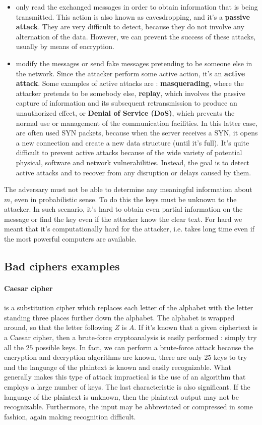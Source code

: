 \documentclass[11pt]{article}
\begin{document}
\begin{itemize}
\item only read the exchanged messages in order to obtain information that is being transmitted. This action is also known as eavesdropping, and it's a \textbf{passive attack}. They are very difficult to detect, because they do not involve any alternation of the data. However, we can prevent the success of these attacks, usually by means of encryption.
\item modify the messages or send fake messages pretending to be someone else in the network. Since the attacker perform some active action, it's an \textbf{active attack}. Some examples of active attacks are : \textbf{masquerading}, where the attacker pretends to be somebody else, \textbf{replay}, which involves the passive capture of information and its subsequent retransmission to produce an unauthorized effect, or \textbf{Denial of Service (DoS)}, which prevents the normal use or management of the communication facilities. In this latter case, are often used SYN packets, because when the server receives a SYN, it opens a new connection and create a new data structure (until it's full). It's quite difficult to prevent active attacks because of the wide variety of potential physical, software and network vulnerabilities. Instead, the goal is to detect active attacks and to recover from any disruption or delays caused by them. 
\end{itemize}
The adversary must not be able to determine any meaningful information about $m$, even in probabilistic sense. To do this the keys must be unknown to the attacker. In such scenario, it's hard to obtain even partial information on the message or find the key even if the attacker know the clear text. For hard we meant that it's computationally hard for the attacker, i.e. takes long time even if the most powerful computers are available.
\subsection{Bad ciphers examples}
\paragraph{Caesar cipher} is a substitution cipher which replaces each letter of the alphabet with the letter standing three places further down the alphabet. The alphabet is wrapped around, so that the letter following $Z$ is $A$. If it's known that a given ciphertext is a Caesar cipher, then a brute-force cryptoanalysis is easily performed : simply try all the $25$ possible keys. In fact, we can perform a brute-force attack because the encryption and decryption algorithms are known, there are only $25$ keys to try and the language of the plaintext is known and easily recognizable. What generally makes this type of attack impractical is the use of an algorithm that employs a large number of keys. The last characteristic is also significant. If the language of the plaintext is unknown, then the plaintext output may not be recognizable. Furthermore, the input may be abbreviated or compressed in some fashion, again making recognition difficult.
\end{document}

